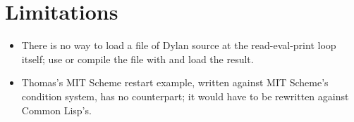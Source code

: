 \section{Limitations}\label{sec:lisp-limitations}

\begin{itemize}
\item There is no way to load a file of Dylan source at the
  read-eval-print loop itself; use  or compile the file
  with  and load the result.
\item Thomas's MIT Scheme restart example, written against MIT Scheme's
  condition system, has no counterpart; it would have to be rewritten
  against Common Lisp's.
\end{itemize}
